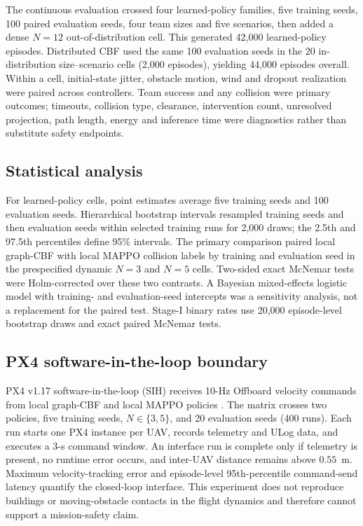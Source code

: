 \documentclass{article}
\begin{document}
The continuous evaluation crossed four learned-policy families, five training seeds, 100 paired evaluation seeds, four team sizes and five scenarios, then added a dense $N=12$ out-of-distribution cell. This generated 42,000 learned-policy episodes. Distributed CBF used the same 100 evaluation seeds in the 20 in-distribution size--scenario cells (2,000 episodes), yielding 44,000 episodes overall. Within a cell, initial-state jitter, obstacle motion, wind and dropout realization were paired across controllers. Team success and any collision were primary outcomes; timeouts, collision type, clearance, intervention count, unresolved projection, path length, energy and inference time were diagnostics rather than substitute safety endpoints.

\subsection{Statistical analysis}
For learned-policy cells, point estimates average five training seeds and 100 evaluation seeds. Hierarchical bootstrap intervals resampled training seeds and then evaluation seeds within selected training runs for 2,000 draws; the 2.5th and 97.5th percentiles define 95\% intervals. The primary comparison paired local graph-CBF with local MAPPO collision labels by training and evaluation seed in the prespecified dynamic $N=3$ and $N=5$ cells. Two-sided exact McNemar tests were Holm-corrected over these two contrasts. A Bayesian mixed-effects logistic model with training- and evaluation-seed intercepts was a sensitivity analysis, not a replacement for the paired test. Stage-I binary rates use 20,000 episode-level bootstrap draws and exact paired McNemar tests.

\subsection{PX4 software-in-the-loop boundary}
PX4 v1.17 software-in-the-loop (SIH) receives 10-Hz Offboard velocity commands from local graph-CBF and local MAPPO policies \citep{meier2015px4}. The matrix crosses two policies, five training seeds, $N\in\{3,5\}$, and 20 evaluation seeds (400 runs). Each run starts one PX4 instance per UAV, records telemetry and ULog data, and executes a 3-s command window. An interface run is complete only if telemetry is present, no runtime error occurs, and inter-UAV distance remains above $0.55$~m. Maximum velocity-tracking error and episode-level 95th-percentile command-send latency quantify the closed-loop interface. This experiment does not reproduce buildings or moving-obstacle contacts in the flight dynamics and therefore cannot support a mission-safety claim.
\end{document}
